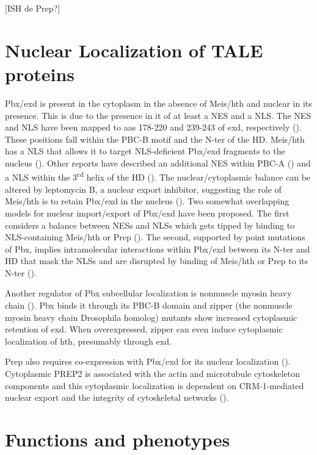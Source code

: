 [ISH de Prep?]


\section{Nuclear Localization of TALE proteins}
\label{sec:nuclearLoc}

Pbx/exd is present in the cytoplasm in the absence of Meis/hth and nuclear in its presence. This is due to the presence in it of at least a \ac{NES} and a \ac{NLS}. The \ac{NES} and \ac{NLS} have been mapped to \acp{aa} 178-220 and 239-243 of exd, respectively (\cite{Abu-Shaar1999}). These positions fall within the PBC-B motif and the \ac{N-ter} of the \ac{HD}. Meis/hth has a \ac{NLS} that allows it to target \ac{NLS}-deficient Pbx/exd fragments to the nucleus (\cite{Abu-Shaar1999}). Other reports have described an additional \ac{NES} within PBC-A (\cite{Berthelsen1999}) and a \ac{NLS} within the 3\textsuperscript{rd} helix of the \ac{HD} (\cite{Saleh2000}). The nuclear/cytoplasmic balance can be altered by leptomycin B, a nuclear export inhibitor, suggesting the role of Meis/hth is to retain Pbx/exd in the nucleus (\cite{Berthelsen1999, Abu-Shaar1999}). Two somewhat overlapping models for nuclear import/export of Pbx/exd have been proposed. The first considers a balance between \acp{NES} and \acp{NLS} which gets tipped by binding to \ac{NLS}-containing Meis/hth or Prep (\cite{Affolter1999}). The second, supported by point mutations of Pbx, implies intramolecular interactions within Pbx/exd between its \ac{N-ter} and \ac{HD} that mask the \acp{NLS} and are disrupted by binding of Meis/hth or Prep to its \ac{N-ter} (\cite{Saleh2000}).

Another regulator of Pbx subcellular localization is nonmuscle myosin heavy chain (\cite{Huang2003}). Pbx binds it through its PBC-B domain and zipper (the nonmuscle myosin heavy chain Drosophila homolog) mutants show increased cytoplasmic retention of \ac{exd}. When overexpressed, zipper can even induce cytoplasmic localization of \ac{hth}, presumably through \ac{exd}.

Prep also requires co-expression with Pbx/exd for its nuclear localization (\cite{Berthelsen1999}). Cytoplasmic PREP2 is associated with the actin and microtubule cytoskeleton components and this cytoplasmic localization is dependent on CRM-1-mediated nuclear export and the integrity of cytoskeletal networks (\cite{Haller2004}).


\section{Functions and phenotypes}

